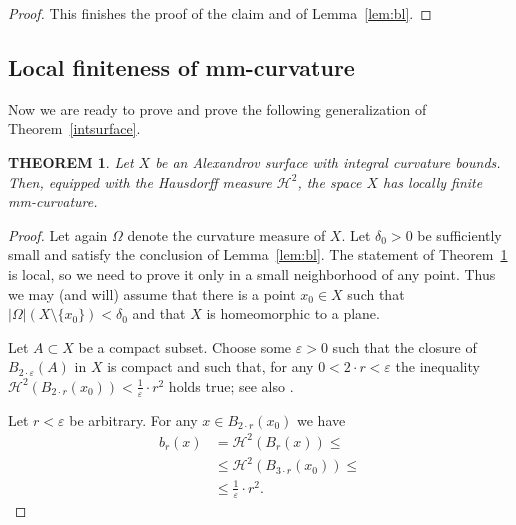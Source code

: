 \documentclass[12pt,leqno,intlimits]{amsart}
\numberwithin{equation}{section}
\newtheorem{thm}{THEOREM}[section]
\theoremstyle{definition}
\theoremstyle{remark}
\newcommand{\tref}[1]{Theorem~\ref{#1}}
\newcommand{\lref}[1]{Lemma~\ref{#1}}
\begin{document}
\begin{proof}
This finishes the proof of the claim and of \lref{lem:bl}.
\end{proof}

\subsection{Local finiteness of mm-curvature}
Now we are ready to prove and prove the following generalization of \tref{intsurface}.
\begin{thm}\label{intsurface1}
Let $X$ be an Alexandrov surface with integral curvature bounds. Then, equipped with the Hausdorff measure $\mathcal H^2$, the space $X$ has locally finite mm-curvature.
\end{thm}
%
\begin{proof}
Let again $\Omega$ denote the curvature measure of $X$. Let $\delta _0>0$ be sufficiently small and satisfy the conclusion of \lref{lem:bl}.
The statement of \tref{intsurface1} is local, so we need to prove it only in a small neighborhood of any point.
Thus we may (and will) assume that there is a point $x_0\in X$
such that $| \Omega| (X \setminus \{ x_0 \}) < \delta _0$ and that $X$ is homeomorphic to a plane.

Let $A\subset X$ be a compact subset. Choose some $\varepsilon >0$ such that the closure of $B_{2{\cdot}\varepsilon} (A)$ in $X$ is compact and such that,
for any $0<2{\cdot}r<\varepsilon$ the inequality $\mathcal H^2 (B_{2{\cdot}r}(x_0)) < \tfrac 1 {\varepsilon}\cdot r^2$ holds true; see also \cite[Lemma 8.1.1]{Reshetnyak-GeomIV}.

Let $r<\varepsilon$ be arbitrary.
For any $x\in B_{2{\cdot}r} (x_0)$ we have 
\begin{align*}
b_r (x) &=\mathcal H^2 (B_r (x)) \leq
\\
&\leq \mathcal H^2 (B_{3{\cdot}r} (x_0)) \leq
\\
&\leq \tfrac 1 {\varepsilon}\cdot r^2.
\end{align*}



\end{proof}
\end{document}
